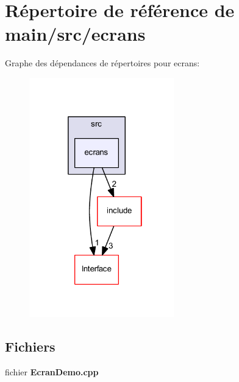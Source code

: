 \section{Répertoire de référence de main/src/ecrans}
\label{dir_ad51b967f79f64a4b3003fb42a4748f1}
Graphe des dépendances de répertoires pour ecrans\+:\nopagebreak
\begin{figure}[H]
\begin{center}
\leavevmode
\includegraphics[width=178pt]{dir_ad51b967f79f64a4b3003fb42a4748f1_dep}
\end{center}
\end{figure}
\subsection*{Fichiers}
\begin{DoxyCompactItemize}
\item 
fichier {\bf Ecran\+Demo.\+cpp}
\end{DoxyCompactItemize}
